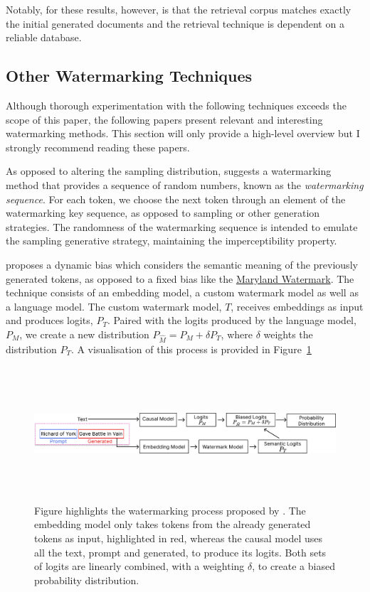 \documentclass{l4proj}
\theoremstyle{definition}
\begin{document}
        Notably, for these results, however, is that the retrieval corpus matches exactly the initial generated documents and the retrieval technique is dependent on a reliable database.
        
    \subsection{Other Watermarking Techniques}
        \label{sec:other-watermarks}
        Although thorough experimentation with the following techniques exceeds the scope of this paper, the following papers present relevant and interesting watermarking methods. This section will only provide a high-level overview but I strongly recommend reading these papers.

        As opposed to altering the sampling distribution, \citet{kuditipudi2023robust} suggests a watermarking method that provides a sequence of random numbers, known as the \emph{watermarking sequence}. For each token, we choose the next token through an element of the watermarking key sequence, as opposed to sampling or other generation strategies. The randomness of the watermarking sequence is intended to emulate the sampling generative strategy, maintaining the imperceptibility property. 

        \citet{liu2024semantic} proposes a dynamic bias which considers the semantic meaning of the previously generated tokens, as opposed to a fixed bias like the \hyperref[sec:maryland-watermark]{Maryland Watermark}. The technique consists of an embedding model, a custom watermark model as well as a language model. The custom watermark model, $T$, receives embeddings as input and produces logits, $P_T$. Paired with the logits produced by the language model, $P_M$, we create a new distribution $P_{\hat{M}} = P_M + \delta P_T$, where $\delta$ weights the distribution $P_T$. A visualisation of this process is provided in Figure~\ref{fig:embedding-watermark-process}

        \begin{figure}[ht]
            \centering
            \includegraphics[height=5cm, width=\linewidth, keepaspectratio]{images/background/embedding-watermark-process.pdf}
            \caption{Figure highlights the watermarking process proposed by \citet{liu2024semantic}. The embedding model only takes tokens from the already generated tokens as input, highlighted in red, whereas the causal model uses all the text, prompt and generated, to produce its logits. Both sets of logits are linearly combined, with a weighting $\delta$, to create a biased probability distribution.}            
            \label{fig:embedding-watermark-process}
        \end{figure}
        
\end{document}
